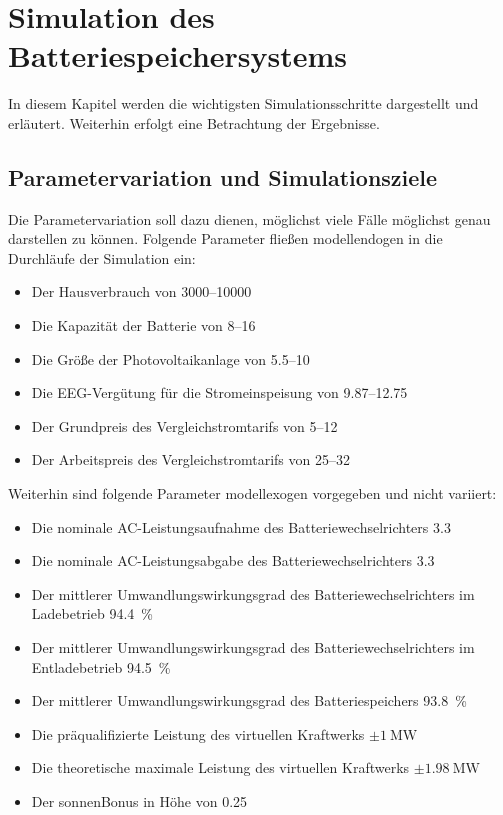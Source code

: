
\section{Simulation des Batteriespeichersystems}

In diesem Kapitel werden die wichtigsten Simulationsschritte dargestellt und erläutert. Weiterhin erfolgt eine Betrachtung der Ergebnisse.

\subsection{Parametervariation und Simulationsziele}

Die Parametervariation soll dazu dienen, möglichst viele Fälle möglichst genau darstellen zu können. Folgende Parameter fließen modellendogen in die Durchläufe der Simulation ein:

\begin{itemize}
\itemsep-0.5em
	\item Der Hausverbrauch von \SIrange{3000}{10000}{\kwh}
	\item Die Kapazität der Batterie von \SIrange{8}{16}{\kwh}
	\item Die Größe der Photovoltaikanlage von \SIrange{5.5}{10}{\kwp}
	\item Die EEG-Vergütung für die Stromeinspeisung von \SIrange{9.87}{12.75}{\ctkwh}
	\item Der Grundpreis des Vergleichstromtarifs von \SIrange{5}{12}{\Eurkwh}
	\item Der Arbeitspreis des Vergleichstromtarifs von \SIrange{25}{32}{\ctkwh}
\end{itemize}

\noindent Weiterhin sind folgende Parameter modellexogen vorgegeben und nicht variiert:

\begin{itemize}
\itemsep-0.5em
	\item Die nominale AC-Leistungsaufnahme des Batteriewechselrichters \SI{3.3}{\kw}
	\item Die nominale AC-Leistungsabgabe des Batteriewechselrichters \SI{3.3}{\kw}
	\item Der mittlerer Umwandlungswirkungsgrad des Batteriewechselrichters im Ladebetrieb \SI{94.4}{\percent}
	\item Der mittlerer Umwandlungswirkungsgrad des Batteriewechselrichters im Entladebetrieb \SI{94.5}{\percent}
	\item Der mittlerer Umwandlungswirkungsgrad des Batteriespeichers \SI{93.8}{\percent}
	\item Die präqualifizierte Leistung des virtuellen Kraftwerks $\pm \SI{1}{\mega\watt}$
	\item Die theoretische maximale Leistung des virtuellen Kraftwerks $\pm \SI{1.98}{\mega\watt}$
	\item Der sonnenBonus in Höhe von \SI{0.25}{\ctkwh}
\end{itemize}


